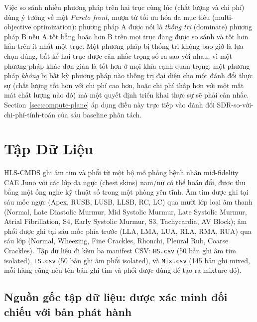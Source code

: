 \documentclass[11pt]{article}
\begin{document}
Việc so sánh nhiều phương pháp trên hai trục cùng lúc (chất lượng và chi
phí) dùng ý tưởng về một \emph{Pareto front}, mượn từ tối ưu hóa đa mục
tiêu (multi-objective optimization): phương pháp A được nói là
\emph{thống trị} (dominate) phương pháp B nếu A tốt bằng hoặc hơn B trên
mọi trục đang được so sánh và tốt hơn hẳn trên ít nhất một trục. Một
phương pháp bị thống trị không bao giờ là lựa chọn đúng, bất kể hai trục
được cân nhắc trọng số ra sao với nhau, vì một phương pháp khác đơn giản
là tốt hơn ở mọi khía cạnh quan trọng; một phương pháp \emph{không} bị bất
kỳ phương pháp nào thống trị đại diện cho một đánh đổi thực sự (chất
lượng tốt hơn với chi phí cao hơn, hoặc chi phí thấp hơn với một mất mát
chất lượng nào đó) mà một quyết định triển khai thực sự sẽ phải cân nhắc.
Section~\ref{sec:compute-plane} áp dụng điều này trực tiếp vào đánh đổi
SDR-so-với-chi-phí-tính-toán của sáu baseline phân tách.

\section{Tập Dữ Liệu}
\label{sec:dataset}

HLS-CMDS \cite{hlscmds} ghi âm tim và phổi từ một bộ mô phỏng bệnh nhân
mid-fidelity CAE Juno với các lớp da ngực (chest skins) nam/nữ có thể
hoán đổi, được thu bằng một ống nghe kỹ thuật số trong một phòng yên
tĩnh. Âm tim được ghi tại sáu mốc ngực (Apex, RUSB, LUSB, LLSB, RC, LC)
qua mười lớp loại âm thanh (Normal, Late Diastolic Murmur, Mid Systolic
Murmur, Late Systolic Murmur, Atrial Fibrillation, S4, Early Systolic
Murmur, S3, Tachycardia, AV Block); âm phổi được ghi tại sáu mốc phía
trước (LLA, LMA, LUA, RLA, RMA, RUA) qua sáu lớp (Normal, Wheezing, Fine
Crackles, Rhonchi, Pleural Rub, Coarse Crackles). Tập dữ liệu đi kèm ba
manifest CSV: \texttt{HS.csv} (50 bản ghi âm tim isolated),
\texttt{LS.csv} (50 bản ghi âm phổi isolated), và \texttt{Mix.csv} (145
bản ghi mixed, mỗi hàng cũng nêu tên bản ghi tim và phổi được dùng để
tạo ra mixture đó).

\subsection{Nguồn gốc tập dữ liệu: được xác minh đối chiếu với bản phát hành}
\label{sec:provenance}
\end{document}
